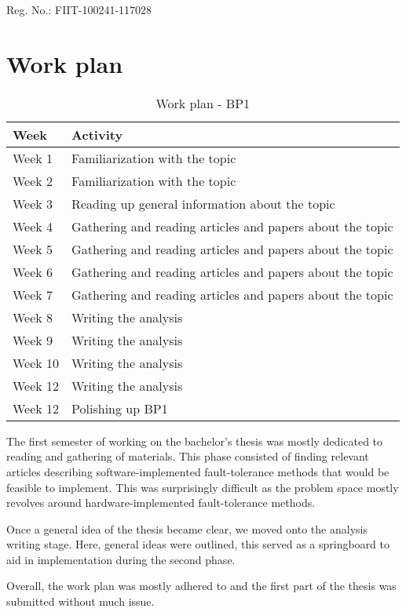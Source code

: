 \documentclass[12pt, letterpaper, slovak]{article}
\begin{document}
\begin{appendices}

Reg. No.: FIIT-100241-117028

\section{Work plan}

\begin{table}[!h]
\centering
\begin{tabular}{|l|l|}
\hline
\textbf{Week} & \textbf{Activity} \\
\hline
Week 1 & Familiarization with the topic \\
Week 2 & Familiarization with the topic \\
Week 3 & Reading up general information about the topic \\
Week 4 & Gathering and reading articles and papers about the topic \\
Week 5 & Gathering and reading articles and papers about the topic \\
Week 6 & Gathering and reading articles and papers about the topic \\
Week 7 & Gathering and reading articles and papers about the topic \\
Week 8 & Writing the analysis \\
Week 9 & Writing the analysis \\
Week 10 & Writing the analysis \\
Week 12 & Writing the analysis \\
Week 12 & Polishing up BP1 \\
\hline
\end{tabular}
\caption{Work plan - BP1}
\label{tab:work_plan_bp1}
\end{table}

The first semester of working on the bachelor's thesis was mostly dedicated to reading and gathering of materials. This phase consisted of finding relevant articles describing software-implemented fault-tolerance methods that would be feasible to implement. This was surprisingly difficult as the problem space mostly revolves around hardware-implemented fault-tolerance methods.

Once a general idea of the thesis became clear, we moved onto the analysis writing stage. Here, general ideas were outlined, this served as a springboard to aid in implementation during the second phase.

Overall, the work plan was mostly adhered to and the first part of the thesis was submitted without much issue.


\end{appendices}
\end{document}
